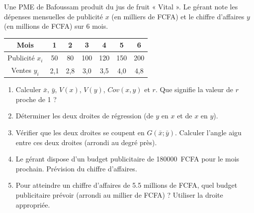 \documentclass[11pt]{article}
\begin{document}
\begin{exercice}
Une PME de Bafoussam produit du jus de fruit « Vital ». Le gérant note les dépenses mensuelles de publicité $x$ (en milliers de FCFA) et le chiffre d'affaires $y$ (en millions de FCFA) sur 6 mois.

\begin{center}
\begin{tabular}{|c|c|c|c|c|c|c|}
\hline
Mois & 1 & 2 & 3 & 4 & 5 & 6 \\
\hline
Publicité $x_i$ & 50 & 80 & 100 & 120 & 150 & 200 \\
\hline
Ventes $y_i$ & 2,1 & 2,8 & 3,0 & 3,5 & 4,0 & 4,8 \\
\hline
\end{tabular}
\end{center}

\begin{enumerate}
    \item Calculer $\bar{x}$, $\bar{y}$, $V(x)$, $V(y)$, $Cov(x,y)$ et $r$. Que signifie la valeur de $r$ proche de 1 ?
    \item Déterminer les deux droites de régression (de $y$ en $x$ et de $x$ en $y$).
    \item Vérifier que les deux droites se coupent en $G(\bar{x} ; \bar{y})$. Calculer l'angle aigu entre ces deux droites (arrondi au degré près).
    \item Le gérant dispose d'un budget publicitaire de \SI{180 000}{FCFA} pour le mois prochain. Prévision du chiffre d'affaires.
    \item Pour atteindre un chiffre d'affaires de \num{5,5} millions de FCFA, quel budget publicitaire prévoir (arrondi au millier de FCFA) ? Utiliser la droite appropriée.
\end{enumerate}
\end{exercice}
\end{document}
